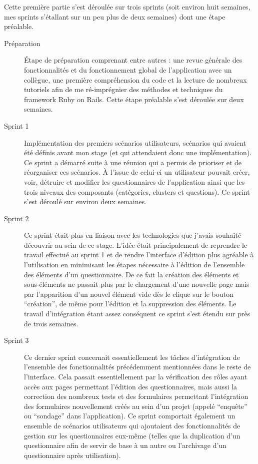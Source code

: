 \documentclass[12pt,a4paper]{book}
\begin{document}
Cette première partie s'est déroulée sur trois sprints (soit environ huit semaines, mes sprints s'étallant sur un peu plus de deux semaines) dont une étape préalable. 

\begin{description}
  \item[Préparation] Étape de préparation comprenant entre autres : une revue générale des fonctionnalités et du fonctionnement global de l'application avec un collègue, une première compréhension du code et la lecture de nombreux tutoriels afin de me ré-imprégnier des méthodes et techniques du framework Ruby on Rails. Cette étape préalable s'est déroulée sur deux semaines.
  \item[Sprint 1] Implémentation des premiers scénarios utilisateurs, scénarios qui avaient été définis avant mon stage (et qui attendaient donc une implémentation). Ce sprint a démarré suite à une réunion qui a permis de prioriser et de réorganiser ces scénarios. À l'issue de celui-ci un utilisateur pouvait créer, voir, détruire et modifier les questionnaires de l'application ainsi que les trois niveaux des composants (catégories, clusters et questions). Ce sprint s'est déroulé sur environ deux semaines.
  \item[Sprint 2] Ce sprint était plus en liaison avec les technologies que j'avais souhaité découvrir au sein de ce stage. L'idée était principalement de reprendre le travail effectué au sprint 1 et de rendre l'interface d'édition plus agréable à l'utilisation en minimisant les étapes nécessaire à l'édition de l'ensemble des éléments d'un questionnaire. De ce fait la création des éléments et sous-éléments ne passait plus par le chargement d'une nouvelle page mais par l'apparition d'un nouvel élément vide dès le clique sur le bouton ``création'', de même pour l'édition et la suppression des éléments. Le travail d'intégration étant assez conséquent ce sprint s'est étendu sur près de trois semaines.
  \item[Sprint 3] Ce dernier sprint concernait essentiellement les tâches d'intégration de l'ensemble des fonctionnalités précédemment mentionnées dans le reste de l'interface. Cela passait essentiellement par la vérification des rôles ayant accès aux pages permettant l'édition des questionnaires, mais aussi la correction des nombreux tests et des formulaires permettant l'intégration des formulaires nouvellement créés au sein d'un projet (appelé ``enquête'' ou ``sondage'' dans l'application). Ce sprint comportait également un ensemble de scénarios utilisateurs qui ajoutaient des fonctionnalités de gestion sur les questionnaires eux-même (telles que la duplication d'un questionnaire afin de servir de base à un autre ou l'archivage d'un questionnaire après utilisation).
\end{description}
\end{document}

